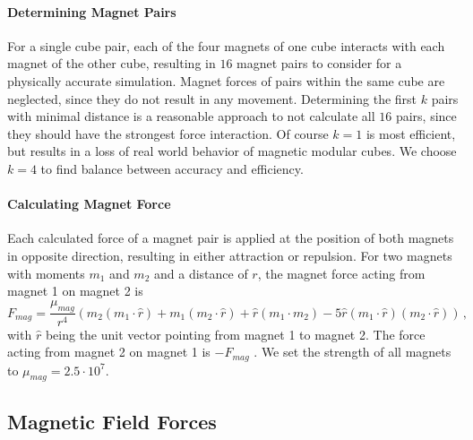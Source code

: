 \newpage

\paragraph{Determining Magnet Pairs}

For a single cube pair, each of the four magnets of one cube interacts with each magnet of the other cube, resulting in $16$ magnet pairs to consider for a physically accurate simulation.
Magnet forces of pairs within the same cube are neglected, since they do not result in any movement.
Determining the first $k$ pairs with minimal distance is a reasonable approach to not calculate all $16$ pairs, since they should have the strongest force interaction.
Of course $k=1$ is most efficient, but results in a loss of real world behavior of magnetic modular cubes.
We choose $k=4$ to find balance between accuracy and efficiency.

\paragraph{Calculating Magnet Force}

Each calculated force of a magnet pair is applied at the position of both magnets in opposite direction, resulting in either attraction or repulsion.
For two magnets with moments $m_1$ and $m_2$ and a distance of $r$, the magnet force acting from magnet 1 on magnet 2 is
\begin{equation}
F_\textit{mag} = \frac{\mu_\textit{mag}}{r^4} \left(m_2(m_1 \cdotp \hat{r}) + m_1(m_2 \cdotp \hat{r}) + \hat{r}(m_1 \cdotp m_2) - 5\hat{r}(m_1 \cdotp \hat{r})(m_2 \cdotp \hat{r}) \right) \, ,
\end{equation}
with $\hat{r}$ being the unit vector pointing from magnet 1 to magnet 2.
The force acting from magnet 2 on magnet 1 is $-F_\textit{mag}$ \cite{levitt2013}.
We set the strength of all magnets to $\mu_\textit{mag} = 2.5 \cdot 10^7$. 

\newpage

\subsection{Magnetic Field Forces}
\label{sec:force_field}

